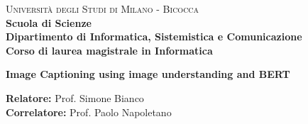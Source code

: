 \documentclass[%
    corpo=11pt,
    oneside,
    oldstyle,
    tipotesi=magistrale,
    greek,
    evenboxes,
]{toptesi}
\begin{document}




\begin{titlepage}
        
        \noindent
        \begin{minipage}[t]{0.19\textwidth}
        \end{minipage}
        \hspace{8mm}
        \begin{minipage}[t]{0.81\textwidth}
        {
                {\textsc{Università degli Studi di Milano - Bicocca}} \\
                \textbf{Scuola di Scienze} \\
                \textbf{Dipartimento di Informatica, Sistemistica e Comunicazione} \\
                \textbf{Corso di laurea magistrale in Informatica} \\
                \par
        }
        \end{minipage}
        
	\vspace{40mm}
        
	\begin{center}
            {\LARGE{
                    \textbf{Image Captioning using image understanding and BERT \\}
                    \par
            }}
        \end{center}
        
        \vspace{50mm}

        \noindent
        {\large \textbf{Relatore:} Prof. Simone Bianco } \\

        \noindent
        {\large \textbf{Correlatore:} Prof. Paolo Napoletano}
        

\end{titlepage}
\end{document}
